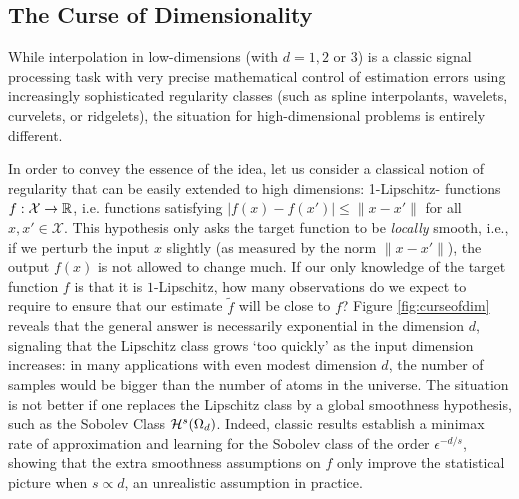 \subsection{The Curse of Dimensionality}

While interpolation in low-dimensions %
(with $d=1,2$ or $3$) is a classic signal processing task with very precise mathematical control of estimation errors using increasingly sophisticated regularity classes (such as spline interpolants, wavelets, curvelets, or ridgelets), the situation for high-dimensional problems is entirely different. 
%



In order to convey the essence of the idea, let us consider a classical notion of regularity that can be easily extended to high dimensions: 1-Lipschitz- functions $f:\mathcal{X} \to \mathbb{R}$, i.e. functions satisfying  $|f(x) - f(x')| \leq \|x - x'\|$ for all $x, x' \in \mathcal{X}$. This hypothesis only asks the target function to be \emph{locally} smooth, i.e., if we perturb the input $x$ slightly (as measured by the norm $\|x - x'\|$), the output $f(x)$ is not allowed to change much. %
If our only knowledge of the target function $f$ is that it is $1$-Lipschitz, how many observations do we expect to require to ensure that our estimate $\tilde{f}$ will be close to $f$? 
Figure \ref{fig:curseofdim} reveals that the general answer is necessarily exponential in the dimension $d$, signaling that the Lipschitz class grows `too quickly' as the input dimension increases: in many applications with even modest dimension $d$, the number of samples would be bigger than the number of atoms in the universe.
 The situation is not better if one replaces the Lipschitz class by a global smoothness hypothesis, such as the Sobolev Class ${\mathcal{H}}^{s}(\Omega_d)$. Indeed, classic results \citep{tsybakov2008introduction} establish a minimax rate of approximation and learning for the Sobolev class of the order $\epsilon^{-d/s}$, showing that the extra smoothness assumptions on $f$ only improve the statistical picture when $s \propto d$, an unrealistic assumption in practice. 

